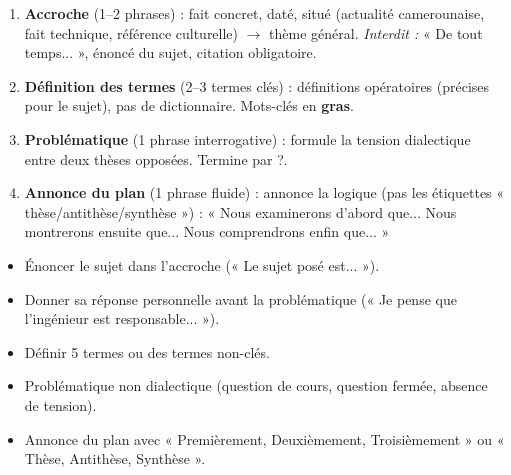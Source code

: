\documentclass[11pt]{article}
\begin{document}
\begin{methode}
\begin{enumerate}
    \item \textbf{Accroche} (1--2 phrases) : fait concret, daté, situé (actualité camerounaise, fait technique, référence culturelle) $\rightarrow$ thème général. \emph{Interdit :} « De tout temps... », énoncé du sujet, citation obligatoire.
    \item \textbf{Définition des termes} (2--3 termes clés) : définitions opératoires (précises pour le sujet), pas de dictionnaire. Mots-clés en \textbf{gras}.
    \item \textbf{Problématique} (1 phrase interrogative) : formule la tension dialectique entre deux thèses opposées. Termine par ?.
    \item \textbf{Annonce du plan} (1 phrase fluide) : annonce la logique (pas les étiquettes « thèse/antithèse/synthèse ») : « Nous examinerons d'abord que... Nous montrerons ensuite que... Nous comprendrons enfin que... »
\end{enumerate}
\end{methode}

\begin{attention}
\begin{itemize}
    \item Énoncer le sujet dans l'accroche (« Le sujet posé est... »).
    \item Donner sa réponse personnelle avant la problématique (« Je pense que l'ingénieur est responsable... »).
    \item Définir 5 termes ou des termes non-clés.
    \item Problématique non dialectique (question de cours, question fermée, absence de tension).
    \item Annonce du plan avec « Premièrement, Deuxièmement, Troisièmement » ou « Thèse, Antithèse, Synthèse ».
\end{itemize}
\end{attention}
\end{document}
